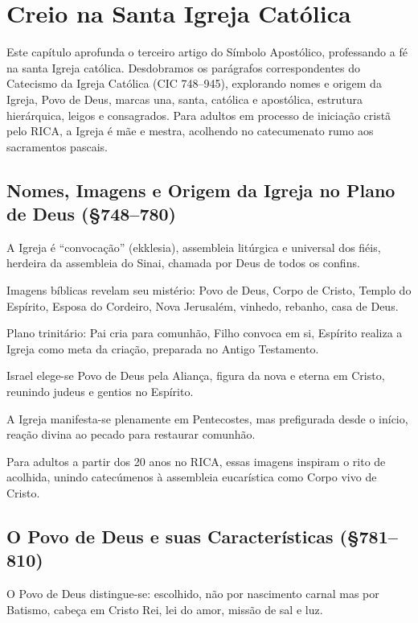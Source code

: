 \chapter{Creio na Santa Igreja Católica}

Este capítulo aprofunda o terceiro artigo do Símbolo Apostólico, professando a fé na santa Igreja católica. Desdobramos os parágrafos correspondentes do Catecismo da Igreja Católica (CIC 748--945), explorando nomes e origem da Igreja, Povo de Deus, marcas una, santa, católica e apostólica, estrutura hierárquica, leigos e consagrados. Para adultos em processo de iniciação cristã pelo RICA, a Igreja é mãe e mestra, acolhendo no catecumenato rumo aos sacramentos pascais.

\section{Nomes, Imagens e Origem da Igreja no Plano de Deus (\S 748--780)}

A Igreja é ``convocação'' (ekklesia), assembleia litúrgica e universal dos fiéis, herdeira da assembleia do Sinai, chamada por Deus de todos os confins.

Imagens bíblicas revelam seu mistério: Povo de Deus, Corpo de Cristo, Templo do Espírito, Esposa do Cordeiro, Nova Jerusalém, vinhedo, rebanho, casa de Deus.

Plano trinitário: Pai cria para comunhão, Filho convoca em si, Espírito realiza a Igreja como meta da criação, preparada no Antigo Testamento.

Israel elege-se Povo de Deus pela Aliança, figura da nova e eterna em Cristo, reunindo judeus e gentios no Espírito.

A Igreja manifesta-se plenamente em Pentecostes, mas prefigurada desde o início, reação divina ao pecado para restaurar comunhão.

Para adultos a partir dos 20 anos no RICA, essas imagens inspiram o rito de acolhida, unindo catecúmenos à assembleia eucarística como Corpo vivo de Cristo.

\section{O Povo de Deus e suas Características (\S 781--810)}

O Povo de Deus distingue-se: escolhido, não por nascimento carnal mas por Batismo, cabeça em Cristo Rei, lei do amor, missão de sal e luz.


